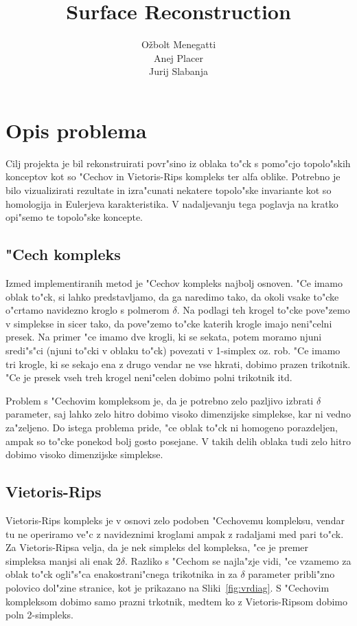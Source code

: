 \documentclass[11pt]{article}
\title{\textbf{Surface Reconstruction}}
\author{O\v zbolt Menegatti\\
		Anej Placer\\
		Jurij Slabanja}
\date{}
\begin{document}
\maketitle

\section{Opis problema}

Cilj projekta je bil rekonstruirati povr"sino iz oblaka to"ck s pomo"cjo topolo"skih konceptov kot so "Cechov in Vietoris-Rips kompleks ter alfa oblike. Potrebno je bilo vizualizirati rezultate in izra"cunati nekatere topolo"ske invariante kot so homologija in Eulerjeva karakteristika. V nadaljevanju tega poglavja na kratko opi"semo te topolo"ske koncepte.

\subsection{"Cech kompleks}
Izmed implementiranih metod je "Cechov kompleks najbolj osnoven. "Ce imamo oblak to"ck, si lahko predstavljamo, da ga naredimo tako, da okoli vsake to"cke o"crtamo navidezno kroglo s polmerom $\delta$. Na podlagi teh krogel to"cke pove"zemo v simplekse in sicer tako, da pove"zemo to"cke katerih krogle imajo neni"celni presek. Na primer "ce imamo dve krogli, ki se sekata, potem moramo njuni sredi"s"ci (njuni to"cki v oblaku to"ck) povezati v 1-simplex oz. rob. "Ce imamo tri krogle, ki se sekajo ena z drugo vendar ne vse hkrati, dobimo prazen trikotnik. "Ce je presek vseh treh krogel neni"celen dobimo polni trikotnik itd. 

Problem s "Cechovim kompleksom je, da je potrebno zelo pazljivo izbrati $\delta$ parameter, saj lahko zelo hitro dobimo visoko dimenzijske simplekse, kar ni vedno za"zeljeno. Do istega problema pride, "ce oblak to"ck ni homogeno porazdeljen, ampak so to"cke ponekod bolj gosto posejane. V takih delih oblaka tudi zelo hitro dobimo visoko dimenzijske simplekse.

\subsection{Vietoris-Rips}
Vietoris-Rips kompleks je v osnovi zelo podoben "Cechovemu kompleksu, vendar tu ne operiramo ve"c z navideznimi kroglami ampak z radaljami med pari to"ck. Za Vietoris-Ripsa velja, da je nek simpleks del kompleksa, "ce je premer simpleksa manjsi ali enak $2\delta$. Razliko s "Cechom se najla"zje vidi, "ce vzamemo za oblak to"ck ogli"s"ca enakostrani"cnega trikotnika in za $\delta$ parameter pribli"zno polovico dol"zine stranice, kot je prikazano na Sliki~\ref{fig:vrdiag}. S "Cechovim kompleksom dobimo samo prazni trkotnik, medtem ko z Vietoris-Ripsom dobimo poln 2-simpleks.
\end{document}
